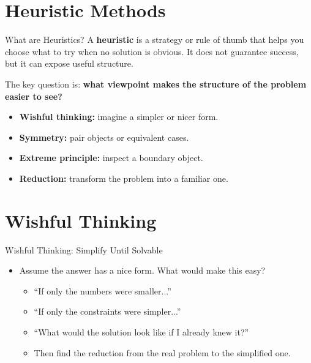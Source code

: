 \documentclass{beamer}
\begin{document}
\section{Heuristic Methods}

\begin{frame}{What are Heuristics?}
    \pause
    A \textbf{heuristic} is a strategy or rule of thumb that helps
    you choose what to try when no solution is obvious. It does not
    guarantee success, but it can expose useful structure.

    The key question is: \textbf{what viewpoint makes the structure
    of the problem easier to see?}

    \pause
    \begin{itemize}
        \item \textbf{Wishful thinking:} imagine a simpler or nicer form.
        \item \textbf{Symmetry:} pair objects or equivalent cases.
        \item \textbf{Extreme principle:} inspect a boundary object.
        \item \textbf{Reduction:} transform the problem into a familiar one.
    \end{itemize}
\end{frame}

\section{Wishful Thinking}

\begin{frame}{Wishful Thinking: Simplify Until Solvable}
    \pause
    \begin{itemize}
        \item Assume the answer has a nice form. What would make this easy?
            \begin{itemize}
                \item ``If only the numbers were smaller...''
                \item ``If only the constraints were simpler...''
                \item ``What would the solution look like if I
                    already knew it?''
                \item Then find the reduction from the real problem to the
                    simplified one.
            \end{itemize}
    \end{itemize}
\end{frame}
\end{document}
